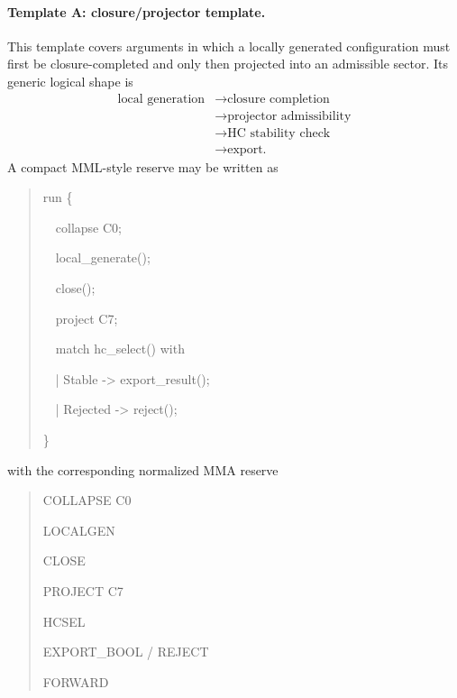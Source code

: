 \paragraph{Template A: closure/projector template.}
This template covers arguments in which a locally generated configuration must first be closure-completed and only then projected into an admissible sector. Its generic logical shape is
\[
\begin{aligned}
\text{local generation}
&\to \text{closure completion}\\
&\to \text{projector admissibility}\\
&\to \text{HC stability check}\\
&\to \text{export.}
\end{aligned}
\]
A compact MML-style reserve may be written as
\begin{quote}
\ttfamily
run \{\par
\ \ collapse C0;\par
\ \ local\_generate();\par
\ \ close();\par
\ \ project C7;\par
\ \ match hc\_select() with\par
\ \ | Stable   -> export\_result();\par
\ \ | Rejected -> reject();\par
\}\par
\end{quote}
with the corresponding normalized MMA reserve
\begin{quote}
\ttfamily
COLLAPSE C0 \par
LOCALGEN \par
CLOSE \par
PROJECT C7 \par
HCSEL \par
EXPORT\_BOOL / REJECT \par
FORWARD
\end{quote}

